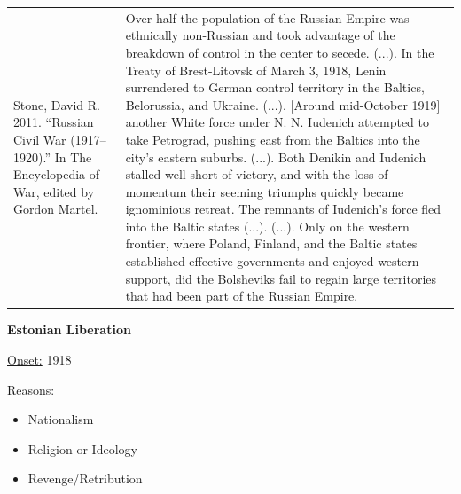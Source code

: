{\begin{longtable}{p{}p{}}
Stone, David R. 2011. “Russian Civil War (1917–1920).” In The Encyclopedia of War, edited by Gordon Martel. & Over half the population of the Russian Empire was ethnically non-Russian and took advantage of the breakdown of control in the center to secede. (...). In the Treaty of Brest-Litovsk of March 3, 1918, Lenin surrendered to German control territory in the Baltics, Belorussia, and Ukraine. (...). [Around mid-October 1919] another White force under N. N. Iudenich attempted to take Petrograd, pushing east from the Baltics into the city's eastern suburbs. (...). Both Denikin and Iudenich stalled well short of victory, and with the loss of momentum their seeming triumphs quickly became ignominious retreat. The remnants of Iudenich's force fled into the Baltic states (...). (...). Only on the western frontier, where Poland, Finland, and the Baltic states established effective governments and enjoyed western support, did the Bolsheviks fail to regain large territories that had been part of the Russian Empire.
\\
\end{longtable}}
\clearpage
         \textbf{Estonian Liberation} 

          \underline{Onset:} 1918         

\underline{Reasons:}
\begin{itemize}
\item Nationalism
\item Religion or Ideology
\item Revenge/Retribution
\end{itemize}

